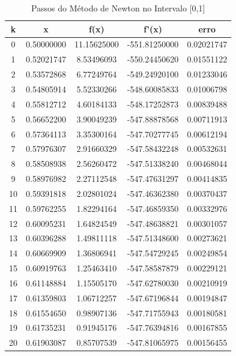\documentclass{article}
\begin{document}
\newpage
\thispagestyle{empty} %
\begin{table}[H]
        \centering
        \vspace{-10pt}
        \caption{\large{Passos do Método de Newton no Intervalo [0,1]}}
        \label{Newton1}
        \begin{tabular}{|c|c| c| c| c | }
        \hline \textbf{k} & \textbf{x} & \textbf{f(x)} & \textbf{f'(x)} & \textbf{erro} \\
        \hline
0 & 0.50000000 & 11.15625000 & -551.81250000 & 0.02021747 \\
1 & 0.52021747 & 8.53496093 & -550.24450620 & 0.01551122 \\
2 & 0.53572868 & 6.77249764 & -549.24920100 & 0.01233046 \\
3 & 0.54805914 & 5.52330266 & -548.60085833 & 0.01006798 \\
4 & 0.55812712 & 4.60184133 & -548.17252873 & 0.00839488 \\
5 & 0.56652200 & 3.90049239 & -547.88878568 & 0.00711913 \\
6 & 0.57364113 & 3.35300164 & -547.70277745 & 0.00612194 \\
7 & 0.57976307 & 2.91660329 & -547.58432248 & 0.00532631 \\
8 & 0.58508938 & 2.56260472 & -547.51338240 & 0.00468044 \\
9 & 0.58976982 & 2.27112548 & -547.47631297 & 0.00414835 \\
10 & 0.59391818 & 2.02801024 & -547.46362380 & 0.00370437 \\
11 & 0.59762255 & 1.82294164 & -547.46859350 & 0.00332976 \\
12 & 0.60095231 & 1.64824549 & -547.48638821 & 0.00301057 \\
13 & 0.60396288 & 1.49811118 & -547.51348600 & 0.00273621 \\
14 & 0.60669909 & 1.36806941 & -547.54729245 & 0.00249854 \\
15 & 0.60919763 & 1.25463410 & -547.58587879 & 0.00229121 \\
16 & 0.61148884 & 1.15505170 & -547.62780030 & 0.00210919 \\
17 & 0.61359803 & 1.06712257 & -547.67196844 & 0.00194847 \\
18 & 0.61554650 & 0.98907136 & -547.71755943 & 0.00180581 \\
19 & 0.61735231 & 0.91945176 & -547.76394816 & 0.00167855 \\
20 & 0.61903087 & 0.85707539 & -547.81065975 & 0.00156455 \\

\end{tabular}
\end{table}
\end{document}

